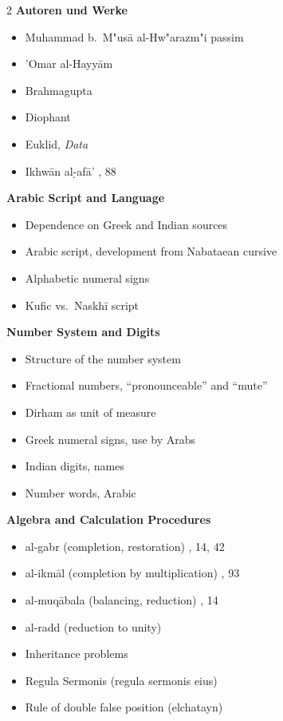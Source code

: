 \documentclass[10pt,a4paper]{article}
\renewcommand{\switchcolumn}{\syncronize\nointerlineskip\columnbreak}
\newcommand{\s}[1]{\d{#1}}
\newcommand{\enquote}[1]{``#1''}
\begin{document}
\begin{paracol}{2}
\textbf{Autoren und Werke}
\begin{itemize}[noitemsep]
\item Muhammad b.\ M"us\=a al-Hw"arazm"{i} \dotfill passim
\item 'Omar al-Hayy\=am 
\item Brahmagupta 
\item Diophant 
\item Euklid, \textit{Data} 
\item Ikhw\=an al-\s{}af\=a' , 88
\end{itemize}
\switchcolumn
\textbf{Arabic Script and Language}
\begin{itemize}[noitemsep]
\item Dependence on Greek and Indian sources 
\item Arabic script, development from Nabataean cursive 
\item Alphabetic numeral signs 
\item Kufic vs.\ Naskh\={i} script 
\end{itemize}

\textbf{Number System and Digits}
\begin{itemize}[noitemsep]
\item Structure of the number system 
\item Fractional numbers, \enquote{pronounceable} and \enquote{mute} 
\item Dirham as unit of measure 
\item Greek numeral signs, use by Arabs 
\item Indian digits, names 
\item Number words, Arabic 
\end{itemize}

\textbf{Algebra and Calculation Procedures}
\begin{itemize}[noitemsep]
\item al-gabr (completion, restoration) , 14, 42
\item al-ikm\=al (completion by multiplication) , 93
\item al-muq\=abala (balancing, reduction) , 14
\item al-radd (reduction to unity) 
\item Inheritance problems 
\item Regula Sermonis (regula sermonis eius) 
\item Rule of double false position (elchatayn) 
\end{itemize}


\end{paracol}
\end{document}
